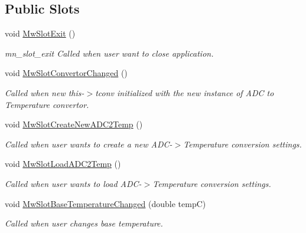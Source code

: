\subsection*{Public Slots}
\begin{DoxyCompactItemize}
\item 
\mbox{\label{class_main_window_a95fb3a2c4f9240d386029d5ffebab1ac}} 
void \hyperlink{class_main_window_a95fb3a2c4f9240d386029d5ffebab1ac}{Mw\+Slot\+Exit} ()
\begin{DoxyCompactList}\small\item\em mn\+\_\+slot\+\_\+exit Called when user want to close application. \end{DoxyCompactList}\item 
\mbox{\label{class_main_window_a360889512281e9ac54ed2456597db083}} 
void \hyperlink{class_main_window_a360889512281e9ac54ed2456597db083}{Mw\+Slot\+Convertor\+Changed} ()
\begin{DoxyCompactList}\small\item\em Called when new this-\/$>$tconv initialized with the new instance of A\+DC to Temperature convertor. \end{DoxyCompactList}\item 
\mbox{\label{class_main_window_a2ef62a3653289364eace9bbf334d904b}} 
void \hyperlink{class_main_window_a2ef62a3653289364eace9bbf334d904b}{Mw\+Slot\+Create\+New\+A\+D\+C2\+Temp} ()
\begin{DoxyCompactList}\small\item\em Called when user wants to create a new A\+D\+C-\/$>$Temperature conversion settings. \end{DoxyCompactList}\item 
\mbox{\label{class_main_window_aa118a1eb2f4ef1693518dff9a852fc68}} 
void \hyperlink{class_main_window_aa118a1eb2f4ef1693518dff9a852fc68}{Mw\+Slot\+Load\+A\+D\+C2\+Temp} ()
\begin{DoxyCompactList}\small\item\em Called when user wants to load A\+D\+C-\/$>$Temperature conversion settings. \end{DoxyCompactList}\item 
void \hyperlink{class_main_window_a0a690287dffb47b6477f2fb50c2a818e}{Mw\+Slot\+Base\+Temperature\+Changed} (double tempC)
\begin{DoxyCompactList}\small\item\em Called when user changes base temperature. \end{DoxyCompactList}\item 

\end{DoxyCompactItemize}
